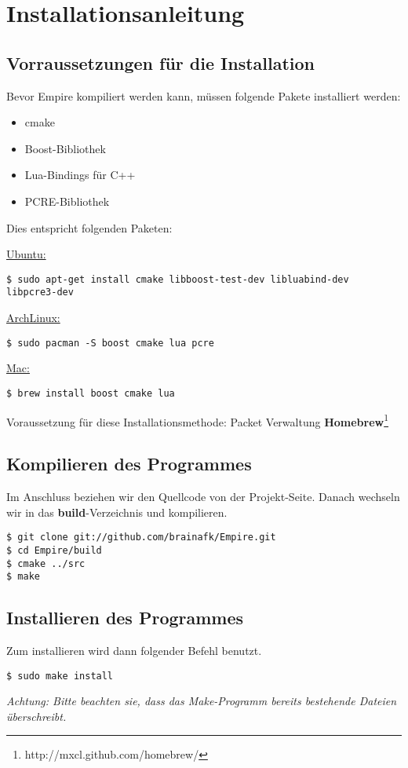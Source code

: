 
\section{Installationsanleitung}

\subsection{Vorraussetzungen für die Installation}
Bevor Empire kompiliert werden kann, müssen folgende Pakete installiert werden:

\begin{itemize}
	\item cmake
	\item Boost-Bibliothek
	\item Lua-Bindings für C++
	\item PCRE-Bibliothek
\end{itemize}

Dies entspricht folgenden Paketen:

\underline{Ubuntu:}
\begin{lstlisting}[style=Bash]
$ sudo apt-get install cmake libboost-test-dev libluabind-dev libpcre3-dev
\end{lstlisting}

\underline{ArchLinux:}
\begin{lstlisting}[style=Bash]
$ sudo pacman -S boost cmake lua pcre
\end{lstlisting}

\underline{Mac:}
\begin{lstlisting}[style=Bash]
$ brew install boost cmake lua
\end{lstlisting}
Voraussetzung für diese Installationsmethode: Packet Verwaltung \textbf{Homebrew}\footnote[1]{http://mxcl.github.com/homebrew/}

\subsection{Kompilieren des Programmes}

Im Anschluss beziehen wir den Quellcode von der Projekt-Seite. Danach wechseln wir in das \textbf{build}-Verzeichnis und kompilieren.

\begin{lstlisting}[style=Bash]
$ git clone git://github.com/brainafk/Empire.git
$ cd Empire/build
$ cmake ../src
$ make
\end{lstlisting}

\subsection{Installieren des Programmes}

Zum installieren wird dann folgender Befehl benutzt.

\begin{lstlisting}[style=Bash]
$ sudo make install
\end{lstlisting}

\emph{Achtung: Bitte beachten sie, dass das Make-Programm bereits bestehende Dateien überschreibt.}
